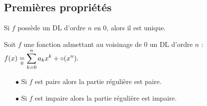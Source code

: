 \documentclass[a4paper, 11pt]{article}
\begin{document}
\subsection{Premi\`{e}res propri\'et\'es}


\begin{prop} 
Si $f$ poss\`ede un DL d'ordre $n$ en 0, alors il est unique.
\end{prop}
 


\begin{corollaire} 
Soit $f$ une fonction admettant au voisinage de $0$ un DL d'ordre $n$ : $f(x)\underset{0}{=}\displaystyle\sum\limits_{k=0}^n a_kx^k+\circ(x^n).$\vsec
\begin{itemize}
 \item[$\bullet$] Si $f$ est paire alors la partie régulière est paire.
\item[$\bullet$]  Si $f$ est impaire alors  la partie régulière est impaire.
\end{itemize}
\end{corollaire}
 
\end{document}

